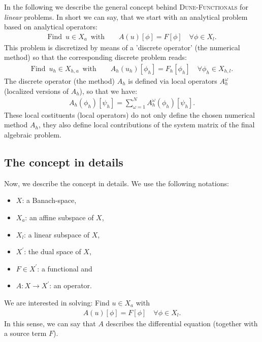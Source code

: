 \documentclass[a4paper,11pt]{article}
\numberwithin{equation}{section}
\newcommand{\dunefunctionals}{\textsc{Dune-Functionals}\xspace}
\begin{document}
In the following we describe the general concept behind \dunefunctionals for {\it linear} problems. In short we can say, that we start with an analytical problem based on analytical operators:
\begin{align*}
\mbox{Find} \enspace u \in X_a \enspace \mbox{with} \qquad A(u)[\phi] = F[\phi] \quad \forall \phi \in X_l.
\end{align*}
This problem is discretized by means of a 'discrete operator' (the numerical method) so that the corresponding discrete problem reads:
\begin{align*}
\mbox{Find} \enspace u_h \in X_{h,a} \enspace \mbox{with} \qquad A_h(u_h)[\phi_h] = F_h[\phi_h] \quad \forall \phi_h \in X_{h,l}.
\end{align*}
The discrete operator (the method) $A_h$ is defined via local operators $A_h^{\omega}$ (localized versions of $A_h$), so that we have:
\begin{align*}
A_h(\phi_h)[\psi_h] = \sum_{\omega =1}^N A_h^{\omega}(\phi_h)[\psi_h].
\end{align*}
These local costituents (local operators) do not only define the chosen numerical method $A_h$, they also define local contributions of the system matrix of the final algebraic problem. 

\subsection{The concept in details}

Now, we describe the concept in details. We use the following notations:
\begin{itemize}
 \item $X$: a Banach-space,
 \item $X_a$: an affine subspace of $X$,
 \item $X_l$: a linear subspace of $X$,
 \item $X^{\prime}$: the dual space of $X$,
 \item $F \in X^{\prime}$: a functional and
 \item $A : X \rightarrow X^{\prime}$: an operator.
\end{itemize}
We are interested in solving: Find $u \in X_a$ with
\begin{align}
\label{original-problem} A(u)[\phi] = F[\phi] \quad \forall \phi \in X_l.
\end{align}
In this sense, we can say that $A$ describes the differential equation (together with a source term $F$).
\end{document}
